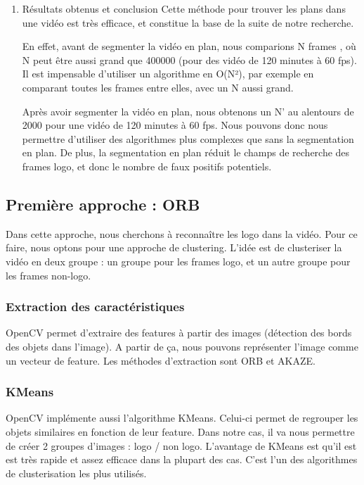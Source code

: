 \documentclass[11pt]{article}
\begin{document}
\begin{enumerate}
\item Résultats obtenus et conclusion
\label{sec:orgaa983a5}
Cette méthode pour trouver les plans dans une vidéo est très efficace, et constitue la base de la suite de notre recherche.

En effet, avant de segmenter la vidéo en plan, nous comparions  N frames , où N peut être aussi grand que 400000 (pour des vidéo de 120 minutes à 60 fps).
Il est impensable d’utiliser un algorithme en O(N²), par exemple en comparant toutes les frames entre elles, avec un N aussi grand.

Après avoir segmenter la vidéo en plan, nous obtenons un N’ au alentours de 2000 pour une vidéo de 120 minutes à 60 fps. 
Nous pouvons donc nous permettre d’utiliser des algorithmes plus complexes que sans la segmentation en plan.
De plus, la segmentation en plan réduit le champs de recherche des frames logo, et donc le nombre de faux positifs potentiels.
\end{enumerate}

\subsection{Première approche : ORB}
\label{sec:orgba96dad}
Dans cette approche, nous cherchons à reconnaître les logo dans la vidéo.
Pour ce faire, nous optons pour une approche de clustering. L'idée est de clusteriser la vidéo en deux groupe : un groupe pour les frames logo, et un autre groupe pour les frames non-logo.

\subsubsection{Extraction des caractéristiques}
\label{sec:orgd2b999a}
OpenCV permet d'extraire des features à partir des images (détection des bords des objets dans l'image).
A partir de ça, nous pouvons représenter l'image comme un vecteur de feature.
Les méthodes d'extraction sont ORB et AKAZE.

\subsubsection{KMeans}
\label{sec:org2afbd08}
OpenCV implémente aussi l'algorithme KMeans. Celui-ci permet de regrouper les objets similaires en fonction de leur feature. 
Dans notre cas, il va nous permettre de créer 2 groupes d'images : logo / non logo.
L'avantage de KMeans est qu'il est est très rapide et assez efficace dans la plupart des cas.
C'est l'un des algorithmes de clusterisation les plus utilisés.
\end{document}
